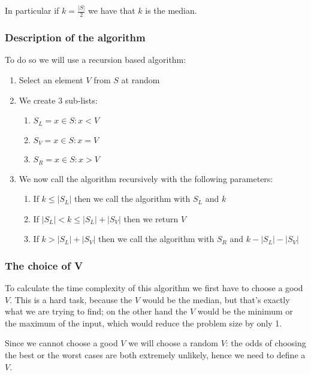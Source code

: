 \documentclass[10pt]{extarticle}
\begin{document}
In particular if $k = \frac{|S|}{2}$ we have that $k$ is the median.

\subsubsection{Description of the algorithm}

To do so we will use a recursion based algorithm:

\begin{enumerate}
    \item Select an element $V$ from $S$ at random
    \item We create 3 sub-lists:
          \begin{enumerate}
              \item $S_L = {x \in S : x < V}$
              \item $S_V = {x \in S : x = V}$
              \item $S_R = {x \in S : x > V}$
          \end{enumerate}
    \item We now call the algorithm recursively with the following parameters:
          \begin{enumerate}
              \item If $k \le |S_L|$ then we call the algorithm with $S_L$ and $k$
              \item If $|S_L| < k \leq |S_L| + |S_V|$ then we return $V$
              \item If $k > |S_L| + |S_V|$ then we call the algorithm with $S_R$ and $k - |S_L| - |S_V|$
          \end{enumerate}
\end{enumerate}

\subsubsection{The choice of V}

To calculate the time complexity of this algorithm we first have to choose a good $V$.
This is a hard task, because the  $V$ would be the median, but that's exactly what we are trying to find;
on the other hand the  $V$ would be the minimum or the maximum of the input, which would reduce the problem size by only 1.

Since we cannot choose a good $V$ we will choose a random $V$:
the odds of choosing the best or the worst cases are both extremely unlikely,
hence we need to define a  $V$.
\end{document}
